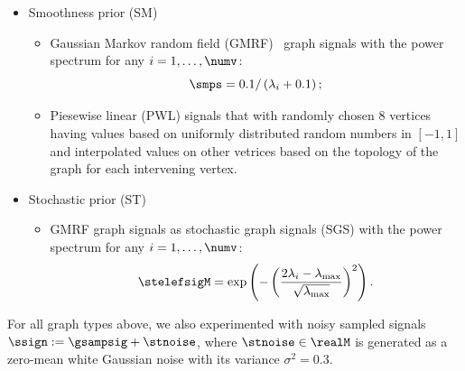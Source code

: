 \documentclass[journal]{IEEEtran}
\begin{document}
\begin{itemize}[align=parleft, left=1.1mm, labelsep=1.1mm, itemindent=0mm]
\begin{itemize}[align=parleft, left=0.5mm, labelsep=1.1mm, itemindent=0mm]
        \begin{equation} \label{PWC}
            \gsig = \sum_{i=1}^{\sbgenn} d_i \sbpwc{i} = [\sbpwc{1} \ \dots \ \sbpwc{\sbgenn}] \sbexpd,
        \end{equation}
        where $\sbpwc{i} \in \realN$ for any $i = 1,\dots,\sbgenn$ is defined as $\sbelepwc{i}{j} = 1$ when the node $j$ is in the $i$-th piece and $\sbelepwc{i}{j} = 0$ otherwise for any $j = 1,\dots,\numv$.
        In this case, the generator matrix is $\sbgenM = [\sbpwc{1} \ \dots \ \sbpwc{\sbgenn}]$.
    \end{itemize}
    For the signal types under the subspace prior, we set $\sbexpd$ as its elements $d_i \sim \mathcal{N}(1,1)$ for all $i = 1,\dots,\sbgenn$ and $\sbgenn = \nums$.
    \item Smoothness prior (SM)
        \begin{itemize}[align=parleft, left=0.5mm, labelsep=1.1mm, itemindent=0mm]
        \item Gaussian Markov random field (GMRF)~\cite{gadde2015probabilistic} graph signals with the power spectrum for any $i = 1, \ldots, \numv$:
        \begin{equation}
            \smps = 0.1 / \left(\lambda_{i} + 0.1\right);
        \end{equation}
        \item Piesewise linear (PWL) signals that with randomly chosen $8$ vertices having values based on uniformly distributed random numbers in $[-1,1]$ and interpolated values on other vetrices based on the topology of the graph for each intervening vertex.
    \end{itemize}
    \item Stochastic prior (ST)
        \begin{itemize}[align=parleft, left=0.5mm,  labelsep=1.1mm, itemindent=0mm]
        \item GMRF graph signals as stochastic graph signals (SGS) with the power spectrum for any $i = 1, \ldots, \numv$:
        \begin{equation}
            \stelefsigM = \exp \left( - \left(
                \frac{
                    {2 \lambda_{i} - \lambda_{\max}}
                }{
                    {\sqrt{\lambda_{\max}}}
                }
            \right) ^2\right).
        \end{equation}
    \end{itemize}
\end{itemize}

For all graph types above, we also experimented with noisy sampled signals $\ssign := \gsampsig + \stnoise$, where $\stnoise \in \realM$ is generated as a zero-mean white Gaussian noise with its variance $\sigma^2=0.3$.
\end{document}
